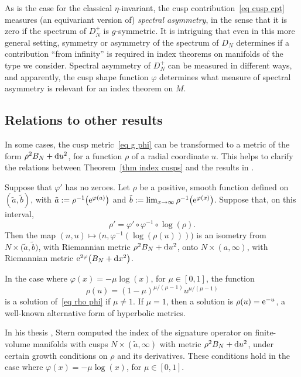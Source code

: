 \documentclass[10pt,a4paper]{amsart}
\numberwithin{equation}{section}
\begin{document}
\begin{Remark}As is the case for the classical $\eta$-invariant, the cusp contribution~\eqref{eq cusp cpt} measures (an equivariant version of) \emph{spectral asymmetry}, in the sense that it is zero if the spectrum of $D_N^+$ is $g$-symmetric.
 It is intriguing that even in this more general setting, symmetry or asymmetry of the spectrum of $D_N$ determines if a contribution ``from infinity'' is required in index theorems on manifolds of the type we consider. Spectral asymmetry of $D_N^+$ can be measured in different ways, and apparently, the cusp shape function $\varphi$ determines what measure of spectral asymmetry is relevant for an index theorem on $M$.
\end{Remark}

\subsection{Relations to other results}\label{sec other results}

In some cases, the cusp metric~\eqref{eq g phi} can be transformed to a metric of the form $\rho^2 B_N + {\rm d}u^2$, for a function $\rho$ of a radial coordinate $u$. This helps to clarify the relations between Theorem~\ref{thm index cusps} and the results in \cite{Baier02, BB03, BBC12, Stern84}.

Suppose that $\varphi'$ has no zeroes.
Let $\rho$ be a positive, smooth function defined on $(\tilde a, \tilde b)$, with $\tilde a:= \rho^{-1}\big({\rm e}^{\varphi(a)}\big)$ and $\tilde b:= \lim_{x \to \infty} \rho^{-1}\big({\rm e}^{\varphi(x)}\big)$. Suppose that, on this interval,
\begin{equation} \label{eq rho phi}
\rho' = \varphi'\circ \varphi^{-1}\circ \log ( \rho).
\end{equation}
Then the map $(n, u) \mapsto \bigl(n, \varphi^{-1}(\log(\rho(u))) \bigr)$ is an isometry from $N \times \big(\tilde a, \tilde b\big)$, with Riemannian metric $\rho^2 B_N + {\rm d}u^2$, onto $N \times (a, \infty)$, with Riemannian metric ${\rm e}^{2\varphi} \big(B_N + {\rm d}x^2\big)$.

In the case where $\varphi(x) =-\mu\log(x)$, for $\mu \in [0,1]$, the function
\[
\rho(u) = (1-\mu)^{\mu/(\mu-1)} u^{\mu/(\mu-1)}
\]
is a solution of~\eqref{eq rho phi} if $\mu \not= 1$. If $\mu = 1$, then a solution is $\rho(u) = {\rm e}^{-u}$, a well-known alternative form of hyperbolic metrics.

In his thesis \cite{Stern84}, Stern computed the index of the signature operator on finite-volume manifolds with cusps $N \times (\tilde a, \infty)$ with metric $\rho^2 B_N + {\rm d}u^2$, under certain growth conditions on $\rho$ and its derivatives. These conditions hold in the case where $\varphi(x) =-\mu\log(x)$, for $\mu \in [0,1]$.
\end{document}
